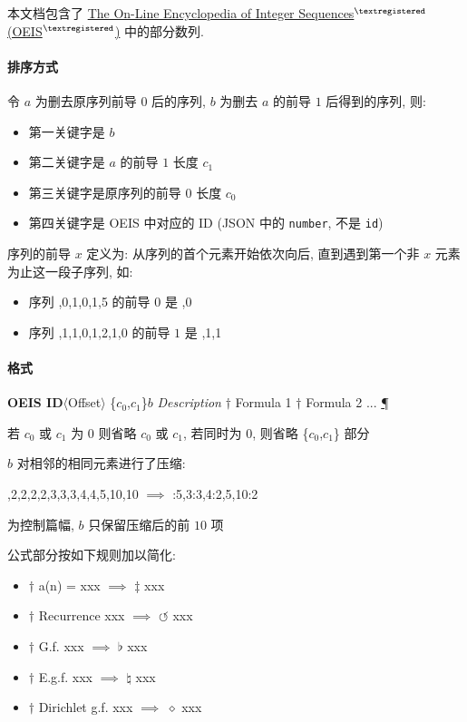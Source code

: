 \documentclass{oeiscommon}
\begin{document}
\thispagestyle{empty}

本文档包含了 \href{\oeis}{The On-Line Encyclopedia of Integer Sequences{\(^{\textregistered}\)} (OEIS{\(^{\textregistered}\)})} 中的部分数列.

\paragraph{排序方式} 令 \(a\) 为删去原序列前导 \(0\) 后的序列, \(b\) 为删去 \(a\) 的前导 \(1\) 后得到的序列, 则:

\begin{itemize}
    \item 第一关键字是 \(b\)
    \item 第二关键字是 \(a\) 的前导 \(1\) 长度 \(c_1\)
    \item 第三关键字是原序列的前导 \(0\) 长度 \(c_0\)
    \item 第四关键字是 OEIS 中对应的 ID (JSON 中的 \verb|number|, 不是 \verb|id|)
\end{itemize}

序列的前导 \(x\) 定义为: 从序列的首个元素开始依次向后, 直到遇到第一个非 \(x\) 元素为止这一段子序列, 如:

\begin{itemize}
    \item 序列 {,0,1,0,1,5} 的前导 \(0\) 是 {,0}
    \item 序列 {,1,1,0,1,2,1,0} 的前导 \(1\) 是 {,1,1}
\end{itemize}

\paragraph{格式} \textbf{OEIS ID}\(\langle\)Offset\(\rangle\) \{\(c_0\),\(c_1\)\}\(b\) \textit{Description} \(\dagger\) Formula 1  \(\dagger\) Formula 2 ... \href{\oeis}{\P}

若 \(c_0\) 或 \(c_1\) 为 \(0\) 则省略 \(c_0\) 或 \(c_1\), 若同时为 \(0\), 则省略 \{\(c_0\),\(c_1\)\} 部分

\(b\) 对相邻的相同元素进行了压缩:

{,2,2,2,2,3,3,3,4,4,5,10,10} \(\implies\) {:5,3:3,4:2,5,10:2}

为控制篇幅, \(b\) 只保留压缩后的前 \(10\) 项

公式部分按如下规则加以简化:

\begin{itemize}
    \item \(\dagger\) a(n) = xxx \(\implies\) \(\ddagger\) xxx 
    \item \(\dagger\) Recurrence xxx \(\implies\) \(\circlearrowleft\) xxx 
    \item \(\dagger\) G.f. xxx \(\implies\) \(\flat\) xxx 
    \item \(\dagger\) E.g.f. xxx \(\implies\) \(\natural\) xxx 
    \item \(\dagger\) Dirichlet g.f. xxx \(\implies\) \(\diamond\) xxx 
\end{itemize}
\end{document}
